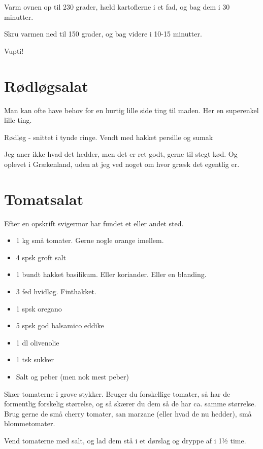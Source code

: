 \documentclass[
]{book}
\providecommand{\tightlist}{%
  \setlength{\itemsep}{0pt}\setlength{\parskip}{0pt}}
\begin{document}
Varm ovnen op til 230 grader, hæld kartoflerne i et fad, og bag dem i 30 minutter.

Skru varmen ned til 150 grader, og bag videre i 10-15 minutter.

Vupti!

\hypertarget{ruxf8dluxf8gsalat}{%
\section{Rødløgsalat}\label{ruxf8dluxf8gsalat}}

Man kan ofte have behov for en hurtig lille side ting til maden. Her en superenkel lille ting.

Rødløg - snittet i tynde ringe.
Vendt med hakket persille og sumak

Jeg aner ikke hvad det hedder, men det er ret godt, gerne til stegt kød. Og oplevet i Grækenland, uden at jeg ved noget om hvor græsk det egentlig er.

\hypertarget{tomatsalat}{%
\section{Tomatsalat}\label{tomatsalat}}

Efter en opskrift svigermor har fundet et eller andet sted.

\begin{itemize}
\tightlist
\item
  1 kg små tomater. Gerne nogle orange imellem.
\item
  4 spsk groft salt
\item
  1 bundt hakket basilikum. Eller koriander. Eller en blanding.
\item
  3 fed hvidløg. Finthakket.
\item
  1 spsk oregano
\item
  5 spsk god balsamico eddike
\item
  1 dl olivenolie
\item
  1 tsk sukker
\item
  Salt og peber (men nok mest peber)
\end{itemize}

Skær tomaterne i grove stykker. Bruger du forskellige tomater, så har de formentlig forskelig størrelse, og så skærer du dem så de har ca. samme størrelse. Brug gerne de små cherry tomater, san marzane (eller hvad de nu hedder), små blommetomater.

Vend tomaterne med salt, og lad dem stå i et dørslag og dryppe af i 1½ time.
\end{document}
